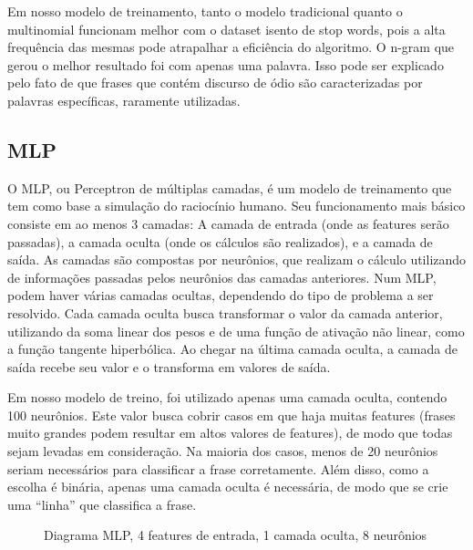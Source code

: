 Em nosso modelo de treinamento, tanto o modelo tradicional quanto o multinomial funcionam melhor com o dataset isento de stop words, pois a alta frequência das mesmas pode atrapalhar a eficiência do algoritmo. O n-gram que gerou o melhor resultado foi com apenas uma palavra. Isso pode ser explicado pelo fato de que frases que contém discurso de ódio são caracterizadas por palavras específicas, raramente utilizadas.

\subsection{MLP}

O MLP, ou Perceptron de múltiplas camadas, é um modelo de treinamento que tem como base a simulação do raciocínio humano. Seu funcionamento mais básico consiste em ao menos 3 camadas: A camada de entrada (onde as features serão passadas), a camada oculta (onde os cálculos são realizados), e a camada de saída. As camadas são compostas por neurônios, que realizam o cálculo utilizando de informações passadas pelos neurônios das camadas anteriores. Num MLP, podem haver várias camadas ocultas, dependendo do tipo de problema a ser resolvido. Cada camada oculta busca transformar o valor da camada anterior, utilizando da soma linear dos pesos e de uma função de ativação não linear, como a função tangente hiperbólica. Ao chegar na última camada oculta, a camada de saída recebe seu valor e o transforma em valores de saída.

Em nosso modelo de treino, foi utilizado apenas uma camada oculta, contendo 100 neurônios. Este valor busca cobrir casos em que haja muitas features (frases muito grandes podem resultar em altos valores de features), de modo que todas sejam levadas em consideração. Na maioria dos casos, menos de 20 neurônios seriam necessários para classificar a frase corretamente. Além disso, como a escolha é binária, apenas uma camada oculta é necessária, de modo que se crie uma “linha” que classifica a frase.

\begin{figure}[!htb]
    \caption{\label{fig:my-label} Diagrama MLP,  4 features de entrada, 1 camada oculta, 8 neurônios}
\end{figure}